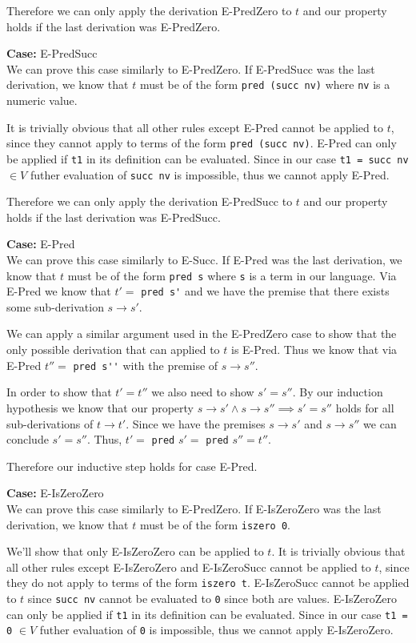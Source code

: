 \documentclass[12pt, fleqn]{article}
\begin{document}
\medskip
Therefore we can only apply the derivation E-PredZero to $t$ and our property holds if the last derivation was E-PredZero.

\medskip
\textbf{Case:} E-PredSucc\\
We can prove this case similarly to E-PredZero. If E-PredSucc was the last derivation, we know that $t$ must
be of the form \verb|pred (succ nv)| where \verb|nv| is a numeric value.

\medskip
It is trivially obvious that all other rules except E-Pred cannot be applied to $t$, since they cannot apply to
terms of the form \verb|pred (succ nv)|. E-Pred can only be applied if \verb|t1| in its definition can be evaluated. 
Since in our case \verb|t1 = succ nv| $\in V$ futher evaluation of \verb|succ nv| is impossible, thus we cannot apply E-Pred.

\medskip
Therefore we can only apply the derivation E-PredSucc to $t$ and our property holds if the last derivation was E-PredSucc.

\medskip
\textbf{Case:} E-Pred\\
We can prove this case similarly to E-Succ.
If E-Pred was the last derivation, we know that $t$ must be of the form \verb|pred s| where \verb|s| is a term in our
language. Via E-Pred we know that $t' = $ \verb|pred s'| and we have the premise that there exists some sub-derivation $s \rightarrow s'$.

We can apply a similar argument used in the E-PredZero case to show that the only possible derivation that can applied to $t$ is
E-Pred. Thus we know that via E-Pred $t'' =$ \verb|pred s''| with the premise of $s \rightarrow s''$. 

In order to show that $t' = t''$ we also need to show $s' = s''$. By our induction hypothesis we know that our
property $s \rightarrow s' \land s \rightarrow s'' \implies s' = s''$ holds for all sub-derivations of $t \rightarrow t'$.
Since we have the premises $s \rightarrow s'$ and $s \rightarrow s''$ we can conclude $s' = s''$. 
Thus, $t' = $ \verb|pred| $s' =$ \verb|pred| $s'' = t''$.

Therefore our inductive step holds for case E-Pred.

\medskip
\textbf{Case:} E-IsZeroZero\\
We can prove this case similarly to E-PredZero. If E-IsZeroZero was the last derivation, 
we know that $t$ must be of the form \verb|iszero 0|.

\medskip
We'll show that only E-IsZeroZero can be applied to $t$. It is trivially obvious that all other rules except
E-IsZeroZero and E-IsZeroSucc cannot be applied to $t$, since they do not apply to terms of the form \verb|iszero t|.
E-IsZeroSucc cannot be applied to $t$ since \verb|succ nv| cannot be evaluated to \verb|0| since both are values.
E-IsZeroZero can only be applied if \verb|t1| in its definition can be evaluated. 
Since in our case \verb|t1 = 0| $\in V$ futher evaluation of \verb|0| is impossible, thus we cannot apply E-IsZeroZero.
\end{document}
